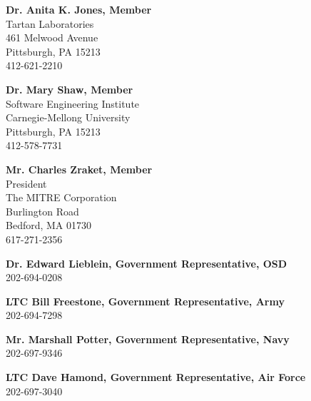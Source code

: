 \documentclass[12pt]{article}
\begin{document}
\medskip

\textbf{Dr. Anita K. Jones, Member}\\
\hspace*{2cm}Tartan Laboratories\\
\hspace*{2cm}461 Melwood Avenue\\
\hspace*{2cm}Pittsburgh, PA 15213\\
\hspace*{2cm}412-621-2210

\medskip

\textbf{Dr. Mary Shaw, Member}\\
\hspace*{2cm}Software Engineering Institute\\
\hspace*{2cm}Carnegie-Mellong University\\
\hspace*{2cm}Pittsburgh, PA 15213\\
\hspace*{2cm}412-578-7731

\medskip

\textbf{Mr. Charles Zraket, Member}\\
\hspace*{2cm}President\\
\hspace*{2cm}The MITRE Corporation\\
\hspace*{2cm}Burlington Road\\
\hspace*{2cm}Bedford, MA 01730\\
\hspace*{2cm}617-271-2356

\medskip

\textbf{Dr. Edward Lieblein, Government Representative, OSD}\\
\hspace*{2cm}202-694-0208

\textbf{LTC Bill Freestone, Government Representative, Army}\\
\hspace*{2cm}202-694-7298

\textbf{Mr. Marshall Potter, Government Representative, Navy}\\
\hspace*{2cm}202-697-9346

\textbf{LTC Dave Hamond, Government Representative, Air Force}\\
\hspace*{2cm}202-697-3040
\end{document}
